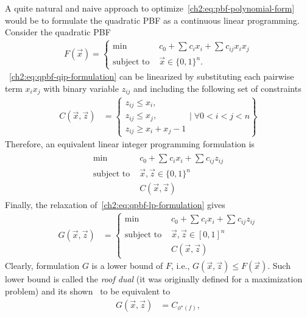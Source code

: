 A quite natural and naive approach to optimize~\cref{ch2:eq:pbf-polynomial-form} would be to formulate the quadratic PBF as a continuous linear programming. Consider the quadratic PBF
\begin{align}
	F(\vec{x}) = \left\{ \begin{array}{rl}
		\min &c_0 + \sum_{}{c_ix_i} + \sum_{}{c_{ij}x_ix_j} \\
	\text{subject to }& \vec{x} \in \{0,1\}^n.
	\end{array}\right.
	\label{ch2:eq:qpbf-qip-formulation}
\end{align}
%
~\cref{ch2:eq:qpbf-qip-formulation} can be linearized by substituting each pairwise term $x_ix_j$ with binary variable $z_{ij}$ and including the following set of constraints 
\begin{align*}
	C(\vec{x},\vec{z}) &= \left\{  \begin{array}{l}
	z_{ij} \leq x_i, \\
	z_{ij} \leq x_j, \\
	z_{ij} \geq x_i + x_j - 1 
	\end{array} \Bigg|\; \forall 0<i<j<n \right\}
\end{align*}
%
Therefore, an equivalent linear integer programming formulation is
\begin{align}
	\begin{array}{rl}
		\min& c_0 + \sum_{}{c_ix_i} + \sum_{}{c_{ij}z_{ij}} \\
		\text{subject to }&  \vec{x},\vec{z} \in \{0,1\}^n\\
		&C(\vec{x},\vec{z})	
	\end{array}
	\label{ch2:eq:qpbf-lp-formulation}
\end{align}
%
Finally, the relaxation of~\cref{ch2:eq:qpbf-lp-formulation} gives
\begin{align*}
	G(\vec{x},\vec{z}) &= \left\{ \begin{array}{rl}
		\min& c_0 + \sum_{}{c_ix_i} + \sum_{}{c_{ij}z_{ij}} \\
		\text{subject to }&  \vec{x},\vec{z} \in [0,1]^n\\
		&C(\vec{x},\vec{z})
	\end{array}\right.
\end{align*}
%
Clearly, formulation $G$ is a lower bound of $F$, i.e.,  $G(\vec{x},\vec{z}) \leq F(\vec{x})$. Such lower bound is called the \emph{roof dual} (it was originally defined for a maximization problem) and its shown~\cite{hammer84} to be equivalent to
\begin{align*}
	G(\vec{x},\vec{z}) &= C_{\phi^{\star}(f)},
\end{align*}
